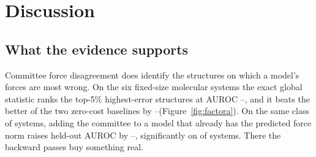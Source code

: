 
\section{Discussion}
\label{sec:discussion}

\subsection{What the evidence supports}

Committee force disagreement does identify the structures on which a model's
forces are most wrong. On the six fixed-size molecular systems the exact global
statistic ranks the top-5\% highest-error structures at AUROC
\fsFactorALo--\fsFactorAHi, and it beats the better of the two zero-cost
baselines by \fsFreeGainLo--\fsFreeGainHi (Figure~\ref{fig:factora}). On the
same class of systems, adding the committee to a model that already has the
predicted force norm raises held-out AUROC by \fsCompFixedLo--\fsCompFixedHi,
significantly on \fsCompFixedSig of \fsCompFixedN systems. There the backward
passes buy something real.

